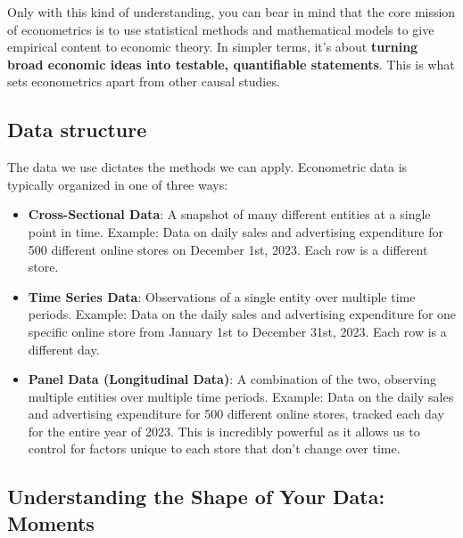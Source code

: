 \documentclass{article}
\begin{document}
Only with this kind of understanding, you can bear in mind that the core mission of econometrics is to use statistical methods and mathematical models to give empirical content to economic theory. In simpler terms, it's about \textbf{turning broad economic ideas into testable, quantifiable statements}. This is what sets econometrics apart from other causal studies.






\subsection{Data structure} %
\label{sub:data_structure}


The data we use dictates the methods we can apply. Econometric data is typically organized in one of three ways:

\begin{itemize}
  \item \textbf{Cross-Sectional Data}: A snapshot of many different entities at a single point in time.
  Example: Data on daily sales and advertising expenditure for 500 different online stores on December 1st, 2023. Each row is a different store.

  \item \textbf{Time Series Data}: Observations of a single entity over multiple time periods.
  Example: Data on the daily sales and advertising expenditure for one specific online store from January 1st to December 31st, 2023. Each row is a different day.

  \item \textbf{Panel Data (Longitudinal Data)}: A combination of the two, observing multiple entities over multiple time periods.
  Example: Data on the daily sales and advertising expenditure for 500 different online stores, tracked each day for the entire year of 2023. This is incredibly powerful as it allows us to control for factors unique to each store that don't change over time.
\end{itemize}



\subsection{Understanding the Shape of Your Data: Moments} %
\label{sub:understanding_the_shape_of_your_data_moments}
\end{document}
